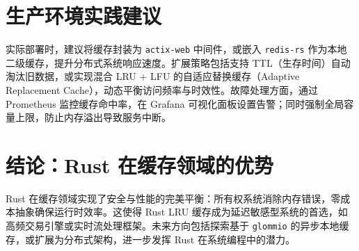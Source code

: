 \chapter{生产环境实践建议}
实际部署时，建议将缓存封装为 \texttt{actix-web} 中间件，或嵌入 \texttt{redis-rs} 作为本地二级缓存，提升分布式系统响应速度。扩展策略包括支持 TTL（生存时间）自动淘汰旧数据，或实现混合 LRU + LFU 的自适应替换缓存（Adaptive Replacement Cache），动态平衡访问频率与时效性。故障处理方面，通过 Prometheus 监控缓存命中率，在 Grafana 可视化面板设置告警；同时强制全局容量上限，防止内存溢出导致服务中断。\par
\chapter{结论：Rust 在缓存领域的优势}
Rust 在缓存领域实现了安全与性能的完美平衡：所有权系统消除内存错误，零成本抽象确保运行时效率。这使得 Rust LRU 缓存成为延迟敏感型系统的首选，如高频交易引擎或实时流处理框架。未来方向包括探索基于 \texttt{glommio} 的异步本地缓存，或扩展为分布式架构，进一步发挥 Rust 在系统编程中的潜力。\par
